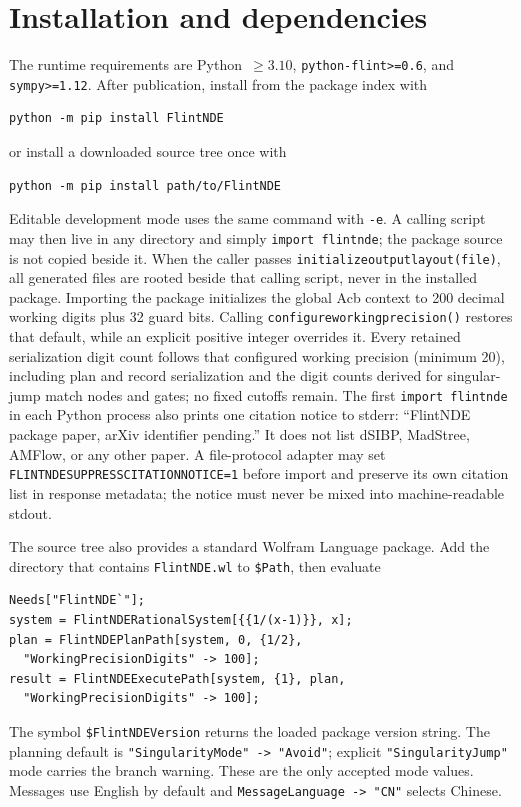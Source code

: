 \documentclass[11pt]{article}
\renewcommand{\_}{\origunderscore\allowbreak}
\begin{document}
\section{Installation and dependencies}
\label{sec:installation}

The runtime requirements are Python~$\geq3.10$, \texttt{python-flint>=0.6}, and
\texttt{sympy>=1.12}.  After publication, install from the package index with
\begin{verbatim}
python -m pip install FlintNDE
\end{verbatim}
or install a downloaded source tree once with
\begin{verbatim}
python -m pip install path/to/FlintNDE
\end{verbatim}
Editable development mode uses the same command with \texttt{-e}.  A calling script may
then live in any directory and simply \texttt{import flintnde}; the package source is not
copied beside it.  When the caller passes \texttt{initialize\_output\_layout(\_\_file\_\_)},
all generated files are rooted beside that calling script, never in the installed package.
Importing the package initializes the global Acb context to 200 decimal working digits plus
32 guard bits.  Calling \texttt{configure\_working\_precision()} restores that default, while
an explicit positive integer overrides it.  Every retained serialization digit count follows
that configured working precision (minimum 20), including plan and record serialization and
the digit counts derived for singular-jump match nodes and gates; no fixed cutoffs remain.
The first \texttt{import flintnde} in each Python process also prints one citation notice to
stderr: ``FlintNDE package paper, arXiv identifier pending.''  It does not list dSIBP,
MadStree, AMFlow, or any other paper.  A file-protocol adapter may set
\texttt{FLINTNDE\_SUPPRESS\_CITATION\_NOTICE=1} before import and preserve its own citation
list in response metadata; the notice must never be mixed into machine-readable stdout.

The source tree also provides a standard Wolfram Language package.  Add the directory that
contains \texttt{FlintNDE.wl} to \texttt{\$Path}, then evaluate
\begin{verbatim}
Needs["FlintNDE`"];
system = FlintNDERationalSystem[{{1/(x-1)}}, x];
plan = FlintNDEPlanPath[system, 0, {1/2},
  "WorkingPrecisionDigits" -> 100];
result = FlintNDEExecutePath[system, {1}, plan,
  "WorkingPrecisionDigits" -> 100];
\end{verbatim}
The symbol \texttt{\$FlintNDEVersion} returns the loaded package version string.  The
planning default is \texttt{"SingularityMode" -> "Avoid"}; explicit
\texttt{"SingularityJump"} mode carries the branch warning.  These are the only accepted
mode values.  Messages use English by default and
\texttt{MessageLanguage -> "CN"} selects Chinese.
\end{document}
